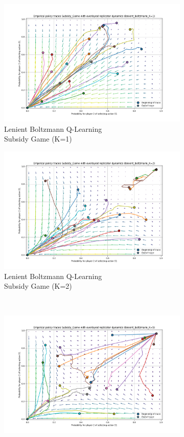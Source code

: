 \documentclass[12pt,letterpaper, onecolumn]{exam}
\begin{document}
\begin{figure}[H]
    \begin{subfigure}{.5\textwidth}
      \centering
      \includegraphics[width=.6\linewidth]{plots/replicator_trajectoreis_Subsidy_Game_lenient_boltzmann_K=1.png}
      \caption{Lenient Boltzmann Q-Learning\\ Subsidy Game (K=1)}
      \label{fig:sfiglbshk1}
    \end{subfigure}
    \begin{subfigure}{.5\textwidth}
      \centering
      \includegraphics[width=.6\linewidth]{plots/replicator_trajectoreis_Subsidy_Game_lenient_boltzmann_K=2.png}
      \caption{Lenient Boltzmann Q-Learning\\ Subsidy Game (K=2)}
      \label{fig:sfiglbshk2}
    \end{subfigure}\\
    \begin{subfigure}{.5\textwidth}
      \centering
      \includegraphics[width=.6\linewidth]{plots/replicator_trajectoreis_Subsidy_Game_lenient_boltzmann_K=5.png}

\end{subfigure}
\end{figure}
\end{document}
